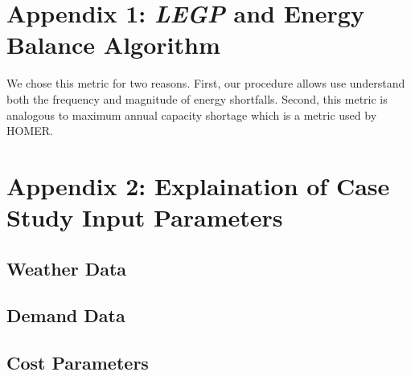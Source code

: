 \documentclass{article}
\begin{document}
\appendix	
\section{Appendix 1: \emph{LEGP} and Energy Balance Algorithm} \label{A1}

We chose this metric for two reasons.
First, our procedure allows use understand both the frequency and magnitude of energy shortfalls. 
Second, this metric is analogous to maximum annual capacity shortage which is a metric used by HOMER.


\section{Appendix 2: Explaination of Case Study Input Parameters} \label{A2}

\subsection{Weather Data}
\subsection{Demand Data}
\subsection{Cost Parameters}

\begin{thebibliography}{9}


\end{thebibliography}
\end{document}
